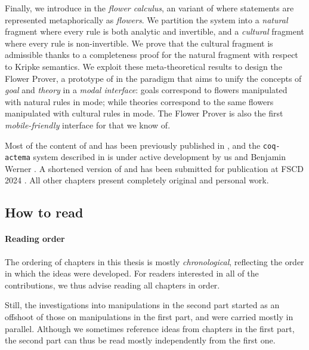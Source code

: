 \begin{description}
  Finally, we introduce in  the \emph{flower calculus}, an
   variant of  where statements are represented
  metaphorically as \emph{flowers}. We partition the system into a
  \emph{natural} fragment where every rule is both analytic and invertible, and
  a \emph{cultural} fragment where every rule is non-invertible. We prove that
  the cultural fragment is admissible thanks to a completeness proof for the
  natural fragment with respect to Kripke semantics. We exploit these
  meta-theoretical results to design the Flower Prover, a prototype of  in
  the  paradigm that aims to unify the concepts of \emph{goal} and
  \emph{theory} in a \emph{modal interface}: goals correspond to flowers
  manipulated with natural rules in \Proof mode; while theories correspond to
  the same flowers manipulated with cultural rules in \Edit mode. The Flower
  Prover is also the first \emph{mobile-friendly} interface for  that we
  know of.
\end{description}

\begin{kaonote}
Most of the content of  and  has been previously published
in \cite{10.1145/3497775.3503692}, and the \texttt{coq-actema} system described
in  is under active development by us and Benjamin Werner
\cite{coq-actema}. A shortened version of  and  has
been submitted for publication at FSCD 2024 \cite{flower-calculus}. All other
chapters present completely original and personal work.
\end{kaonote}

\subsection{How to read}

\paragraph{Reading order}

The ordering of chapters in this thesis is mostly \emph{chronological},
reflecting the order in which the ideas were developed. For readers interested
in all of the contributions, we thus advise reading all chapters in order.

Still, the investigations into  manipulations in the second part started
as an offshoot of those on  manipulations in the first part, and were
carried mostly in parallel. Although we sometimes reference ideas from chapters
in the first part, the second part can thus be read mostly independently from
the first one.

